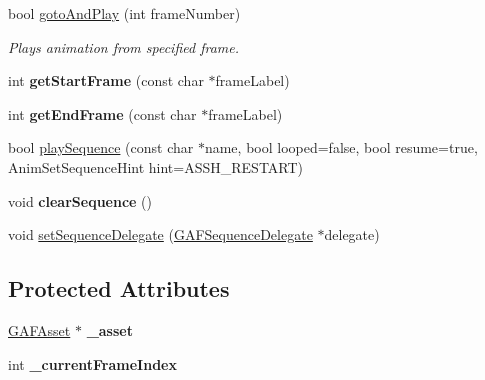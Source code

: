 \begin{DoxyCompactItemize}
\item 
\hypertarget{class_g_a_f_1_1_g_a_f_animation_a47b7d4bf50567a802c9dd7c9db9c4f2e}{bool \hyperlink{class_g_a_f_1_1_g_a_f_animation_a47b7d4bf50567a802c9dd7c9db9c4f2e}{goto\-And\-Play} (int frame\-Number)}\label{class_g_a_f_1_1_g_a_f_animation_a47b7d4bf50567a802c9dd7c9db9c4f2e}

\begin{DoxyCompactList}\small\item\em Plays animation from specified frame. \end{DoxyCompactList}\item 
\hypertarget{class_g_a_f_1_1_g_a_f_animation_ac89a67e10a2d924e61fad7abd8425941}{int {\bfseries get\-Start\-Frame} (const char $\ast$frame\-Label)}\label{class_g_a_f_1_1_g_a_f_animation_ac89a67e10a2d924e61fad7abd8425941}

\item 
\hypertarget{class_g_a_f_1_1_g_a_f_animation_acba2cb2c2419810c4844dd2ae9f8e3d7}{int {\bfseries get\-End\-Frame} (const char $\ast$frame\-Label)}\label{class_g_a_f_1_1_g_a_f_animation_acba2cb2c2419810c4844dd2ae9f8e3d7}

\item 
bool \hyperlink{class_g_a_f_1_1_g_a_f_animation_ad028c73c5230df3d28c17a64308affc6}{play\-Sequence} (const char $\ast$name, bool looped=false, bool resume=true, Anim\-Set\-Sequence\-Hint hint=A\-S\-S\-H\-\_\-\-R\-E\-S\-T\-A\-R\-T)
\item 
\hypertarget{class_g_a_f_1_1_g_a_f_animation_a5e511bc4a57e19db743aab01b66fc479}{void {\bfseries clear\-Sequence} ()}\label{class_g_a_f_1_1_g_a_f_animation_a5e511bc4a57e19db743aab01b66fc479}

\item 
void \hyperlink{class_g_a_f_1_1_g_a_f_animation_a2cb44dad0426d774ee28597b5d09dca5}{set\-Sequence\-Delegate} (\hyperlink{class_g_a_f_1_1_g_a_f_sequence_delegate}{G\-A\-F\-Sequence\-Delegate} $\ast$delegate)
\end{DoxyCompactItemize}
\subsection*{Protected Attributes}
\begin{DoxyCompactItemize}
\item 
\hypertarget{class_g_a_f_1_1_g_a_f_animation_a5237206b9ce62ef7cf8701f6c8a529da}{\hyperlink{class_g_a_f_1_1_g_a_f_asset}{G\-A\-F\-Asset} $\ast$ {\bfseries \-\_\-asset}}\label{class_g_a_f_1_1_g_a_f_animation_a5237206b9ce62ef7cf8701f6c8a529da}

\item 
\hypertarget{class_g_a_f_1_1_g_a_f_animation_a05555677b7af6a0c1b5e6bed2c4aeed0}{int {\bfseries \-\_\-current\-Frame\-Index}}\label{class_g_a_f_1_1_g_a_f_animation_a05555677b7af6a0c1b5e6bed2c4aeed0}

\end{DoxyCompactItemize}


